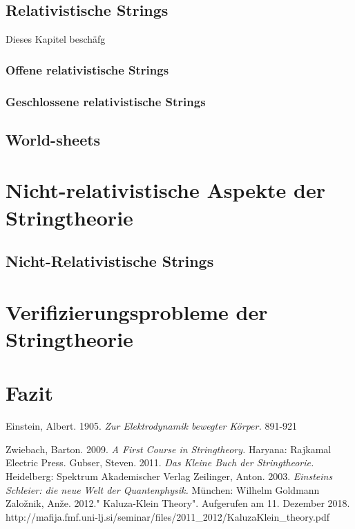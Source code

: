 \documentclass[a4paper, 12pt]{article}
\begin{document}
\subsection{Relativistische Strings}

Dieses Kapitel beschäfg

\subsubsection{Offene relativistische Strings}

\subsubsection{Geschlossene relativistische Strings}

\subsection{World-sheets}

\section{Nicht-relativistische Aspekte der \\ Stringtheorie}

\subsection{Nicht-Relativistische Strings}

\section{Verifizierungsprobleme der Stringtheorie}

\section{Fazit}

\begin{thebibliography}{9}

Einstein, Albert. 1905. 
\textit{Zur Elektrodynamik bewegter Körper.}
891-921

Zwiebach, Barton. 2009.
\textit{A First Course in Stringtheory.}
Haryana: Rajkamal Electric Press.
Gubser, Steven. 2011. 
\textit{Das Kleine Buch der Stringtheorie.}
Heidelberg: Spektrum Akademischer Verlag
Zeilinger, Anton. 2003.
\textit{Einsteins Schleier: die neue Welt der Quantenphysik.}
München: Wilhelm Goldmann
Zalo\v{z}nik, An\v{z}e. 2012." Kaluza-Klein Theory". Aufgerufen am 11. Dezember 2018.\\
http://mafija.fmf.uni-lj.si/seminar/files/2011\_2012/KaluzaKlein\_theory.pdf
\end{thebibliography}
\end{document}
